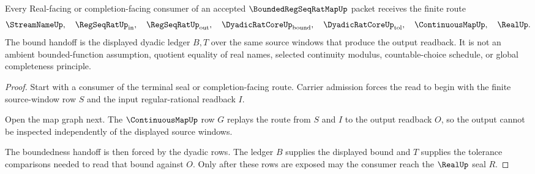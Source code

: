 \begin{theorem}
\label{thm:bounded-regseqrat-map-uniform-bound-handoff}
Every Real-facing or completion-facing consumer of an accepted $\BoundedRegSeqRatMapUp$ packet receives the finite route
$$
\StreamNameUp,\quad
\RegSeqRatUp_{\mathrm{in}},\quad
\RegSeqRatUp_{\mathrm{out}},\quad
\DyadicRatCoreUp_{\mathrm{bound}},\quad
\DyadicRatCoreUp_{\mathrm{tol}},\quad
\ContinuousMapUp,\quad
\RealUp .
$$
The bound handoff is the displayed dyadic ledger $B,T$ over the same source windows that produce the output readback. It is not an ambient bounded-function assumption, quotient equality of real names, selected continuity modulus, countable-choice schedule, or global completeness principle.
\end{theorem}
\begin{proof}
Start with a consumer of the terminal seal or completion-facing route. Carrier admission forces the read to begin with the finite source-window row $S$ and the input regular-rational readback $I$.

Open the map graph next. The $\ContinuousMapUp$ row $G$ replays the route from $S$ and $I$ to the output readback $O$, so the output cannot be inspected independently of the displayed source windows.

The boundedness handoff is then forced by the dyadic rows. The ledger $B$ supplies the displayed bound and $T$ supplies the tolerance comparisons needed to read that bound against $O$. Only after these rows are exposed may the consumer reach the $\RealUp$ seal $R$.
\end{proof}




